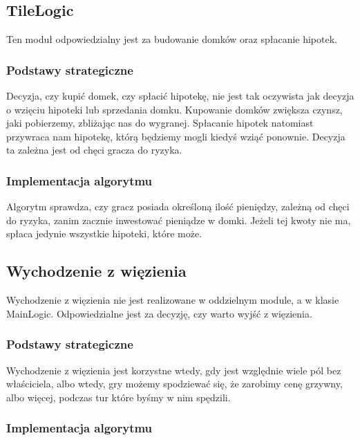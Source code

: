 \documentclass{article}
\begin{document}
\subsection{TileLogic}

Ten moduł odpowiedzialny jest za budowanie domków oraz spłacanie hipotek.

\subsubsection{Podstawy strategiczne}

Decyzja, czy kupić domek, czy spłacić hipotekę, nie jest tak oczywista jak decyzja o wzięciu hipoteki lub sprzedania domku. Kupowanie domków zwiększa czynsz, jaki pobierzemy, zbliżając nas do wygranej. Spłacanie hipotek natomiast przywraca nam hipotekę, którą będziemy mogli kiedyś wziąć ponownie. Decyzja ta zależna jest od chęci gracza do ryzyka.

\subsubsection{Implementacja algorytmu}

Algorytm sprawdza, czy gracz posiada określoną ilość pieniędzy, zależną od chęci do ryzyka, zanim zacznie inwestować pieniądze w domki. Jeżeli tej kwoty nie ma, spłaca jedynie wszystkie hipoteki, które może.

\subsection{Wychodzenie z więzienia}

Wychodzenie z więzienia nie jest realizowane w oddzielnym module, a w klasie MainLogic. Odpowiedzialne jest za decyzję, czy warto wyjść z więzienia.

\subsubsection{Podstawy strategiczne}

Wychodzenie z więzienia jest korzystne wtedy, gdy jest względnie wiele pól bez właściciela, albo wtedy, gry możemy spodziewać się, że zarobimy cenę grzywny, albo więcej, podczas tur które byśmy w nim spędzili.

\subsubsection{Implementacja algorytmu}
\end{document}
